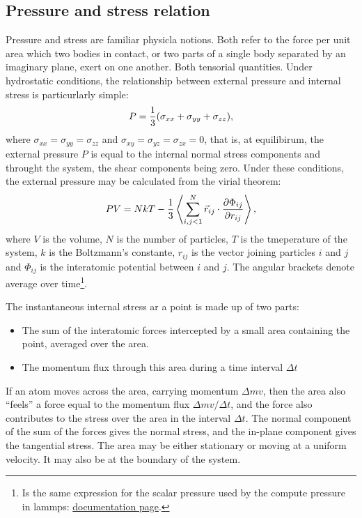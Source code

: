 \documentclass[../../main-notes.tex]{subfiles}
\begin{document}
\subsection{Pressure and stress relation}

Pressure and stress are familiar physicla notions. 
Both refer to the force per unit area which two bodies in contact, or two parts of a single body separated by an imaginary plane, exert on one another.
Both tensorial quantities\citep{Tsai_1979}.
Under hydrostatic conditions, the relationship between external pressure and internal stress is particurlarly simple:
\begin{gather}
    P = \frac{1}{3}\qty(\sigma_{xx}+\sigma_{yy}+\sigma_{zz}),
\end{gather}
where $\sigma_{xx}=\sigma_{yy}=\sigma_{zz}$ and $\sigma_{xy}=\sigma_{yz}=\sigma_{zx}=0$, that is, at equilibirum, the external pressure $P$ is equal to the internal normal stress components and throught the system, the shear components being zero.
Under these conditions, the external pressure may be calculated from the virial theorem:
\begin{gather}
    PV = NkT-\frac{1}{3}\left\langle\sum_{i,j<1}^N\vec{r}_{ij}\cdot\pdv{\Phi_{ij}}{r_{ij}}\right\rangle,
\end{gather}
where $V$ is the volume, $N$ is the number of particles, $T$ is the tmeperature of the system, $k$ is the Boltzmann's constante, $r_{ij}$  is the vector joining particles $i$ and $j$ and $\Phi_{ij}$ is the interatomic potential between $i$ and $j$.
The angular brackets denote average over time\footnote{Is the same expression for the scalar pressure used by the compute pressure in lammps: \href{https://docs.lammps.org/compute_pressure.html}{documentation page}.}.

The instantaneous internal stress ar a point is made up of two parts:
\begin{itemize}
    \item The sum of the interatomic forces intercepted by a small area containing the point, averaged over the area.
    \item The momentum flux through this area during a time interval $\Delta t$
\end{itemize}
If an atom moves across the area, carrying momentum $\Delta mv$, then the area also ``feels'' a force equal to the momentum flux $\Delta mv/\Delta t$, and the force also contributes to the stress over the area in the interval $\Delta t$.
The normal component of the sum of the forces gives the normal stress, and the in-plane component gives the tangential stress.
The area may be either stationary or moving at a uniform velocity.
It may also be at the boundary of the system.
\end{document}
